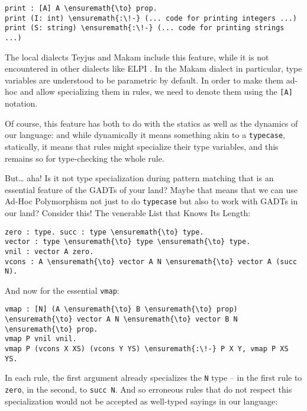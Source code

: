\begin{verbatim}
print : [A] A \ensuremath{\to} prop.
print (I: int) \ensuremath{:\!-} (... code for printing integers ...)
print (S: string) \ensuremath{:\!-} (... code for printing strings ...)
\end{verbatim}

The local dialects Teyjus
\citep{teyjus-main-reference,teyjus-2-implementation} and Makam include
this feature, while it is not encountered in other dialects like ELPI
\citep{elpi-main-reference}. In the Makam dialect in particular, type
variables are understood to be parametric by default. In order to make
them ad-hoc and allow specializing them in rules, we need to denote them
using the \texttt{{[}A{]}} notation.

Of course, this feature has both to do with the statics as well as the
dynamics of our language: and while dynamically it means something akin
to a \texttt{typecase}, statically, it means that rules might specialize
their type variables, and this remains so for type-checking the whole
rule.

But\ldots{} aha! Is it not type specialization during pattern matching
that is an essential feature of the GADTs of your land? Maybe that means
that we can use Ad-Hoc Polymorphism not just to do \texttt{typecase} but
also to work with GADTs in our land? Consider this! The venerable List
that Knows Its Length:

\begin{verbatim}
zero : type. succ : type \ensuremath{\to} type.
vector : type \ensuremath{\to} type \ensuremath{\to} type.
vnil : vector A zero.
vcons : A \ensuremath{\to} vector A N \ensuremath{\to} vector A (succ N).
\end{verbatim}

And now for the essential \texttt{vmap}:

\begin{verbatim}
vmap : [N] (A \ensuremath{\to} B \ensuremath{\to} prop) \ensuremath{\to} vector A N \ensuremath{\to} vector B N \ensuremath{\to} prop.
vmap P vnil vnil.
vmap P (vcons X XS) (vcons Y YS) \ensuremath{:\!-} P X Y, vmap P XS YS.
\end{verbatim}

In each rule, the first argument already specializes the \texttt{N} type
-- in the first rule to \texttt{zero}, in the second, to
\texttt{succ\ N}. And so erroneous rules that do not respect this
specialization would not be accepted as well-typed sayings in our
language:

